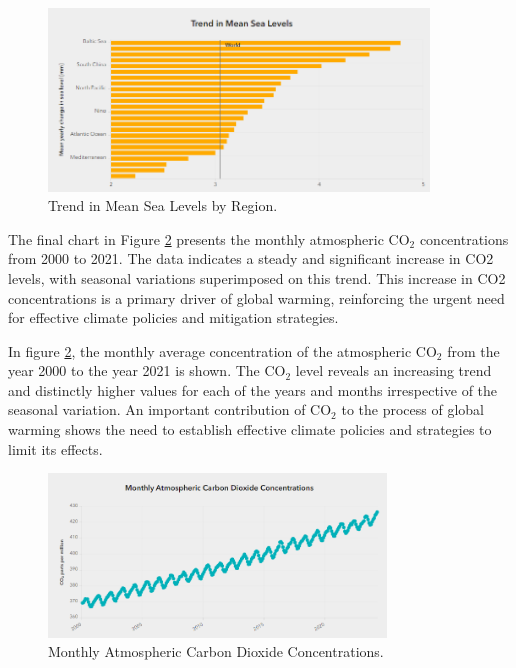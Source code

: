 \documentclass[a4paper,11pt]{article}
\begin{document}
\begin{figure}[ht!]
    \centering
    \includegraphics[width=0.9\textwidth]{pictures/sea_levels2.png}
    \caption{Trend in Mean Sea Levels by Region.}
    \label{fig:sea_levels2}
\end{figure}

The final chart in Figure \ref{fig:co2_conc} presents the monthly atmospheric \(\text{CO}_2\) concentrations from 2000 to 2021. The data indicates a steady and significant increase in CO2 levels, with seasonal variations superimposed on this trend. This increase in CO2 concentrations is a primary driver of global warming, reinforcing the urgent need for effective climate policies and mitigation strategies.

In figure \ref{fig:co2_conc}, the monthly average concentration of the atmospheric \(\text{CO}_2\) from the year 2000 to the year 2021 is shown. The \(\text{CO}_2\) level reveals an increasing trend and distinctly higher values for each of the years and months irrespective of the seasonal variation. An important contribution of \(\text{CO}_2\) to the process of global warming shows the need to establish effective climate policies and strategies to limit its effects.

\begin{figure}[ht!]
    \centering
    \includegraphics[width=0.8\textwidth]{pictures/co2_conc.png}
    \caption{Monthly Atmospheric Carbon Dioxide Concentrations.}
    \label{fig:co2_conc}
\end{figure}
\end{document}
